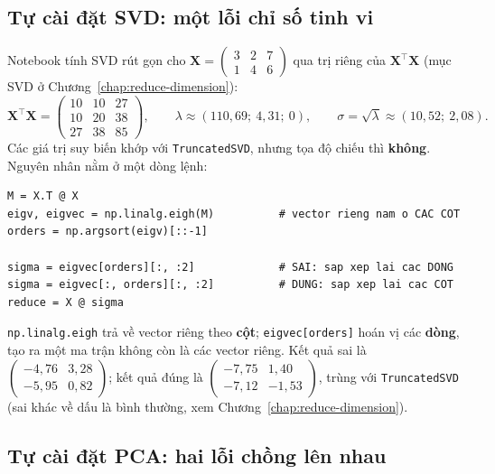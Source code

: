 \subsection{Tự cài đặt SVD: một lỗi chỉ số tinh vi}

Notebook tính SVD rút gọn cho $\mathbf{X} = \begin{pmatrix} 3 & 2 & 7 \\ 1 & 4 & 6 \end{pmatrix}$ qua trị riêng của $\mathbf{X}^\top\mathbf{X}$ (mục SVD ở Chương~\ref{chap:reduce-dimension}):
\[
    \mathbf{X}^\top\mathbf{X} = \begin{pmatrix} 10 & 10 & 27 \\ 10 & 20 & 38 \\ 27 & 38 & 85 \end{pmatrix},
    \qquad \lambda \approx (110{,}69;\ 4{,}31;\ 0),
    \qquad \sigma = \sqrt{\lambda} \approx (10{,}52;\ 2{,}08).
\]
Các giá trị suy biến khớp với \texttt{TruncatedSVD}, nhưng tọa độ chiếu thì \textbf{không}. Nguyên nhân nằm ở một dòng lệnh:

\begin{lstlisting}[caption={Lỗi sắp xếp vector riêng theo dòng thay vì theo cột}]
M = X.T @ X
eigv, eigvec = np.linalg.eigh(M)          # vector rieng nam o CAC COT
orders = np.argsort(eigv)[::-1]

sigma = eigvec[orders][:, :2]             # SAI: sap xep lai cac DONG
sigma = eigvec[:, orders][:, :2]          # DUNG: sap xep lai cac COT
reduce = X @ sigma
\end{lstlisting}

\texttt{np.linalg.eigh} trả về vector riêng theo \textbf{cột}; \texttt{eigvec[orders]} hoán vị các \textbf{dòng}, tạo ra một ma trận không còn là các vector riêng. Kết quả sai là $\begin{pmatrix} -4{,}76 & 3{,}28 \\ -5{,}95 & 0{,}82 \end{pmatrix}$; kết quả đúng là $\begin{pmatrix} -7{,}75 & 1{,}40 \\ -7{,}12 & -1{,}53 \end{pmatrix}$, trùng với \texttt{TruncatedSVD} (sai khác về dấu là bình thường, xem Chương~\ref{chap:reduce-dimension}).

\subsection{Tự cài đặt PCA: hai lỗi chồng lên nhau}

